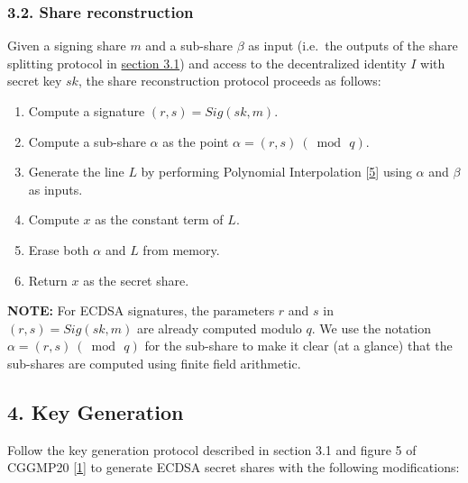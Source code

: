 \documentclass[
]{article}
\providecommand{\tightlist}{%
  \setlength{\itemsep}{0pt}\setlength{\parskip}{0pt}}
\begin{document}
\hypertarget{share-reconstruction}{%
\subsubsection{3.2. Share reconstruction}\label{share-reconstruction}}

Given a signing share \(m\) and a sub-share \(\beta\) as input (i.e.~the
outputs of the share splitting protocol in
\protect\hyperlink{share-splitting}{section 3.1}) and access to the
decentralized identity \(I\) with secret key \(sk\), the share
reconstruction protocol proceeds as follows:

\begin{enumerate}
\def\labelenumi{\arabic{enumi}.}
\tightlist
\item
  Compute a signature \((r, s) = Sig(sk, m)\).
\item
  Compute a sub-share \(\alpha\) as the point
  \(\alpha = (r, s) \: (\bmod \, q)\).
\item
  Generate the line \(L\) by performing Polynomial Interpolation
  {[}\protect\hyperlink{ref-wiki:interpolation}{5}{]} using \(\alpha\)
  and \(\beta\) as inputs.
\item
  Compute \(x\) as the constant term of \(L\).
\item
  Erase both \(\alpha\) and \(L\) from memory.
\item
  Return \(x\) as the secret share.
\end{enumerate}

\textbf{NOTE:} For ECDSA signatures, the parameters \(r\) and \(s\) in
\((r, s) = Sig(sk, m)\) are already computed modulo \(q\). We use the
notation \(\alpha = (r, s) \: (\bmod \, q)\) for the sub-share to make
it clear (at a glance) that the sub-shares are computed using finite
field arithmetic.

\hypertarget{key-generation}{%
\subsection{4. Key Generation}\label{key-generation}}

Follow the key generation protocol described in section 3.1 and figure 5
of CGGMP20 {[}\protect\hyperlink{ref-cggmp20}{1}{]} to generate ECDSA
secret shares with the following modifications:
\end{document}

